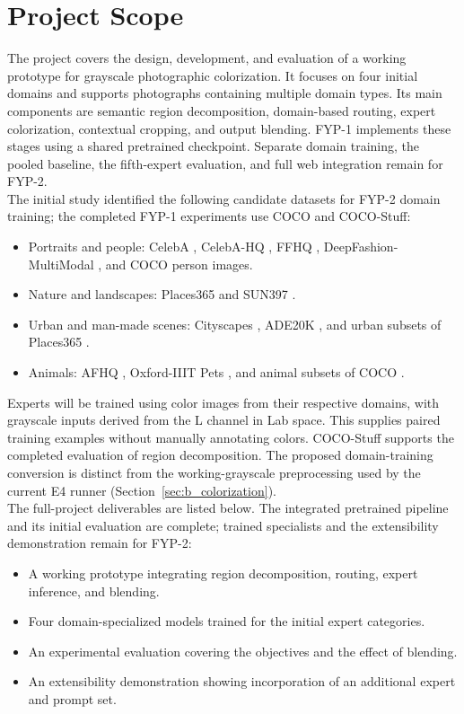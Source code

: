 \documentclass{FastFyp}
\begin{document}
\section{Project Scope}
The project covers the design, development, and evaluation of a working prototype for grayscale photographic colorization. It focuses on four initial domains and supports photographs containing multiple domain types. Its main components are semantic region decomposition, domain-based routing, expert colorization, contextual cropping, and output blending. FYP-1 implements these stages using a shared pretrained checkpoint. Separate domain training, the pooled baseline, the fifth-expert evaluation, and full web integration remain for FYP-2.\\
The initial study identified the following candidate datasets for FYP-2 domain training; the completed FYP-1 experiments use COCO and COCO-Stuff:
\begin{itemize}
    \item Portraits and people: CelebA \cite{celeba2015}, CelebA-HQ \cite{pggan2018}, FFHQ \cite{ffhq2019}, DeepFashion-MultiModal \cite{text2human2022}, and COCO \cite{ref19} person images.
    \item Nature and landscapes: Places365 \cite{places365} and SUN397 \cite{sun397}.
    \item Urban and man-made scenes: Cityscapes \cite{ref20}, ADE20K \cite{ref18}, and urban subsets of Places365 \cite{places365}.
    \item Animals: AFHQ \cite{afhq2020}, Oxford-IIIT Pets \cite{pets2012}, and animal subsets of COCO \cite{ref19}.
\end{itemize}
Experts will be trained using color images from their respective domains, with grayscale inputs derived from the L channel in Lab space. This supplies paired training examples without manually annotating colors. COCO-Stuff \cite{caesar2018cocostuff} supports the completed evaluation of region decomposition. The proposed domain-training conversion is distinct from the working-grayscale preprocessing used by the current E4 runner (Section~\ref{sec:b_colorization}).\\
The full-project deliverables are listed below. The integrated pretrained pipeline and its initial evaluation are complete; trained specialists and the extensibility demonstration remain for FYP-2:
\begin{itemize}
    \item A working prototype integrating region decomposition, routing, expert inference, and blending.
    \item Four domain-specialized models trained for the initial expert categories.
    \item An experimental evaluation covering the objectives and the effect of blending.
    \item An extensibility demonstration showing incorporation of an additional expert and prompt set.
\end{itemize}
\end{document}
